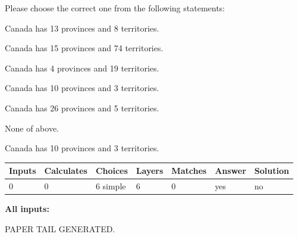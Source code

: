 \documentclass[12pt]{article}
\begin{document}
  
Please choose the correct one from the following statements:
 
 
Canada has  13 provinces and  8 territories.
 
 
Canada has  15 provinces and  74 territories.
 
 
Canada has   4 provinces and  19 territories.
 
 
Canada has 10  provinces and 3 territories.
 
 
Canada has  26 provinces and  5 territories.
 
 
 None of above.
 
 
\noindent{}
 
 
Canada has 10  provinces and 3 territories.
 
 
\noindent{}
 
 
   
   
   
   
\noindent\begin{tabular}{|l|l|l|l|l|l|l|}
 \hline
Inputs & Calculates & Choices & Layers & Matches & Answer & Solution \\ \hline
 0  & 
 0  & 
 6
  simple  
  & 
 6  & 
 0  & 
  yes & 
  no 
  \\ \hline
 \end{tabular}
   
   
   
   
\noindent{}
   
   
   
   
\noindent\vspace{0.1in}\hspace{-0.08in} {\textbf{\Large{All inputs: }}}
   
   
   
   
   
   
 \vspace{0.2in}
 
   
   
\vspace{2.0in} PAPER TAIL GENERATED.
   
   
   
\end{document}
